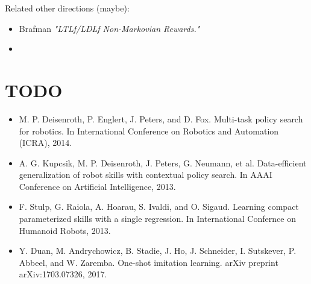 Related other directions (maybe):
\begin{itemize}
	\item Brafman \etal \textit{"LTLf/LDLf Non-Markovian Rewards."}
	\item 	
\end{itemize}

\section{TODO}
\begin{itemize}
	\item M. P. Deisenroth, P. Englert, J. Peters, and D. Fox. Multi-task policy search for robotics. In International Conference on Robotics and Automation (ICRA), 2014.
	\item A. G. Kupcsik, M. P. Deisenroth, J. Peters, G. Neumann, et al. Data-efficient generalization of robot skills with contextual policy search. In AAAI Conference on Artificial Intelligence, 2013.
	\item F. Stulp, G. Raiola, A. Hoarau, S. Ivaldi, and O. Sigaud. Learning compact parameterized skills with a single regression. In International Confernce on Humanoid Robots, 2013.
	\item Y. Duan, M. Andrychowicz, B. Stadie, J. Ho, J. Schneider, I. Sutskever, P. Abbeel, and W. Zaremba. One-shot imitation learning. arXiv preprint arXiv:1703.07326, 2017.
\end{itemize}